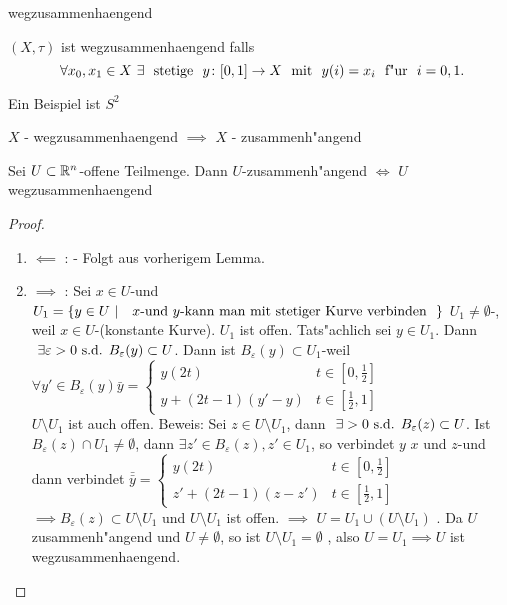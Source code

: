 \documentclass[class=article, crop=false]{standalone}
\begin{document}
\begin{zettel}{wegzusammenhaengend}
\begin{flashcard}[]{}
	\begin{definition}
		$(X,\tau)$ ist wegzusammenhaengend falls
		\[
			\forall x_0,x_1 \in  X \exists \tx{ stetige } y \from [0,1] \to X \tx{ mit } y(i)=  x_i \tx{ f"ur } i =  0,1
		.\]
	\end{definition}
\end{flashcard}
\begin{example}
	Ein Beispiel ist $S^2$
\end{example}
\begin{lemma}
	$X$ - wegzusammenhaengend $\implies $ $X$ - zusammenh"angend
\end{lemma}
\begin{lemma}
	Sei $U \subset \mathbb{R}^n$-offene Teilmenge. Dann $U$-zusammenh"angend $\iff $ $U$ wegzusammenhaengend
\end{lemma}
\begin{proof}
	\begin{enumerate}
		\item $\impliedby $ : - Folgt aus vorherigem Lemma.
		\item $\implies $ : Sei $x \in  U$-und $U_1 =\set{y \in  U}{\tx{ $x$-und $y$-kann man mit stetiger Kurve verbinden } }$ $U_1 \neq \emptyset $-, weil $x \in  U$-(konstante Kurve). $U_1$ ist offen. Tats"achlich sei $y \in  U_1$. Dann $\exists \varepsilon > 0 \tx{s.d.} B_{\varepsilon}(y) \subset  U$. Dann ist $B_{\varepsilon}(y) \subset  U_1$-weil $\forall y' \in  B_{\varepsilon}(y) \bar{y} = \begin{cases}
				      y (2t)           & t \in  [0,\frac{1}{2}] \\
				      y + (2t-1)(y'-y) & t \in  [\frac{1}{2},1]
			      \end{cases}$\\

		      $U \setminus U_1$ ist auch offen. Beweis: Sei $z \in  U \setminus  U_1 $, dann $\exists >0 \tx{s.d.} B_{\varepsilon}(z) \subset  U$. Ist $B_{\varepsilon}(z) \cap  U_1 \neq  \emptyset $, dann $\exists  z' \in  B_{\varepsilon}(z), z' \in  U_1$, so verbindet $y$ $x$ und $z$-und dann verbindet $\bar{\bar{y}} = \begin{cases}
				      y(2t)           & t \in [0,\frac{1}{2}]   \\
				      z'+(2t-1)(z-z') & t \in  [\frac{1}{2}, 1]
			      \end{cases}$\\

		      $\implies B_{\varepsilon}(z) \subset U \setminus U_1$ und $U \setminus U_1$ ist offen. $\implies $ $U = U_1 \cup (U \setminus  U_1)$ . Da $U$ zusammenh"angend und $U \neq  \emptyset $, so ist $U \setminus U_1 = \emptyset $ , also $U = U_1 \implies U$ ist wegzusammenhaengend.

	\end{enumerate}
\end{proof}
\end{zettel}
\end{document}
